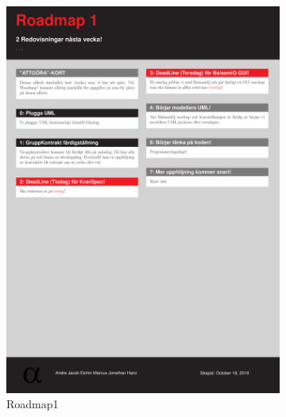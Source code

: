 \documentclass{article}
\theoremstyle{remark}                                         %
\begin{document}
\begin{figure}
    \centering
    \begin{subfigure}[b]{0.3\textwidth}
        \includegraphics[width=\textwidth]{img/OBJKURS1_Roadmap.pdf}
        \caption{Roadmap1}
        \label{fig:road1}
    \end{subfigure}
    \begin{subfigure}[b]{0.3\textwidth}

\end{subfigure}
\end{figure}
\end{document}
